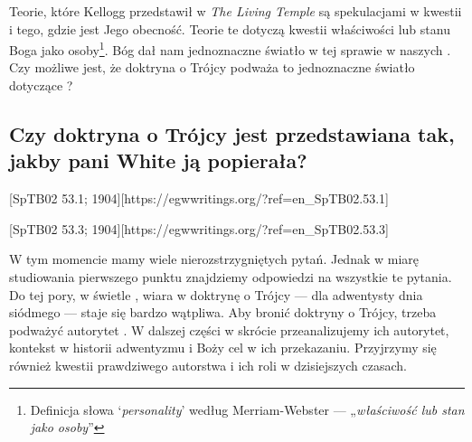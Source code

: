 Teorie, które Kellogg przedstawił w \textit{The Living Temple} są spekulacjami w kwestii  i tego, gdzie jest Jego obecność. Teorie te dotyczą kwestii właściwości lub stanu Boga jako osoby\footnote{Definicja słowa ‘\textit{personality}’ według Merriam-Webster — „\textit{właściwość lub stan jako osoby}”}. Bóg dał nam jednoznaczne światło w tej sprawie w naszych . Czy możliwe jest, że doktryna o Trójcy podważa to jednoznaczne światło dotyczące ?

\subsection*{Czy doktryna o Trójcy jest przedstawiana tak, jakby pani White ją popierała?}

[SpTB02 53.1; 1904][https://egwwritings.org/?ref=en\_SpTB02.53.1]

[SpTB02 53.3; 1904][https://egwwritings.org/?ref=en\_SpTB02.53.3]

W tym momencie mamy wiele nierozstrzygniętych pytań. Jednak w miarę studiowania pierwszego punktu  znajdziemy odpowiedzi na wszystkie te pytania. Do tej pory, w świetle , wiara w doktrynę o Trójcy — dla adwentysty dnia siódmego — staje się bardzo wątpliwa. Aby bronić doktryny o Trójcy, trzeba podważyć autorytet . W dalszej części w skrócie przeanalizujemy ich autorytet, kontekst w historii adwentyzmu i Boży cel w ich przekazaniu. Przyjrzymy się również kwestii prawdziwego autorstwa  i ich roli w dzisiejszych czasach.


